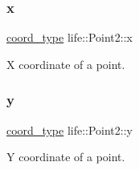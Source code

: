\subsubsection{\texorpdfstring{x}{x}}
{\footnotesize\ttfamily \mbox{\hyperlink{structlife_1_1_point2_abc66c92a3ad99b7fb9d8c179213edf58}{coord\+\_\+type}} life\+::\+Point2\+::x}



X coordinate of a point. 

\mbox{\label{structlife_1_1_point2_aeb68123ffdb09000bb989dd38bb37af7}} 
\subsubsection{\texorpdfstring{y}{y}}
{\footnotesize\ttfamily \mbox{\hyperlink{structlife_1_1_point2_abc66c92a3ad99b7fb9d8c179213edf58}{coord\+\_\+type}} life\+::\+Point2\+::y}

Y coordinate of a point. 